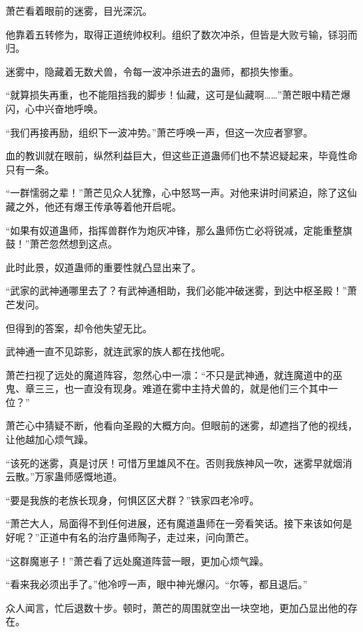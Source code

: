 
\begin{this_body}



萧芒看着眼前的迷雾，目光深沉。

他靠着五转修为，取得正道统帅权利。组织了数次冲杀，但皆是大败亏输，铩羽而归。

迷雾中，隐藏着无数犬兽，令每一波冲杀进去的蛊师，都损失惨重。

“就算损失再重，也不能阻挡我的脚步！仙藏，这可是仙藏啊……”萧芒眼中精芒爆闪，心中兴奋地呼唤。

“我们再接再励，组织下一波冲势。”萧芒呼唤一声，但这一次应者寥寥。

血的教训就在眼前，纵然利益巨大，但这些正道蛊师们也不禁迟疑起来，毕竟性命只有一条。

“一群懦弱之辈！”萧芒见众人犹豫，心中怒骂一声。对他来讲时间紧迫，除了这仙藏之外，他还有爆王传承等着他开启呢。

“如果有奴道蛊师，指挥兽群作为炮灰冲锋，那么蛊师伤亡必将锐减，定能重整旗鼓！”萧芒忽然想到这点。

此时此景，奴道蛊师的重要性就凸显出来了。

“武家的武神通哪里去了？有武神通相助，我们必能冲破迷雾，到达中枢圣殿！”萧芒发问。

但得到的答案，却令他失望无比。

武神通一直不见踪影，就连武家的族人都在找他呢。

萧芒扫视了远处的魔道阵容，忽然心中一凛：“不只是武神通，就连魔道中的巫鬼、章三三，也一直没有现身。难道在雾中主持犬兽的，就是他们三个其中一位？”

萧芒心中猜疑不断，他看向圣殿的大概方向。但眼前的迷雾，却遮挡了他的视线，让他越加心烦气躁。

“该死的迷雾，真是讨厌！可惜万里雄风不在。否则我族神风一吹，迷雾早就烟消云散。”万家蛊师感慨地道。

“要是我族的老族长现身，何惧区区犬群？”铁家四老冷哼。

“萧芒大人，局面得不到任何进展，还有魔道蛊师在一旁看笑话。接下来该如何是好呢？”正道中有名的治疗蛊师陶子，走过来，问向萧芒。

“这群魔崽子！”萧芒看了远处魔道阵营一眼，更加心烦气躁。

“看来我必须出手了。”他冷哼一声，眼中神光爆闪。“尔等，都且退后。”

众人闻言，忙后退数十步。顿时，萧芒的周围就空出一块空地，更加凸显出他的存在。


\end{this_body}
